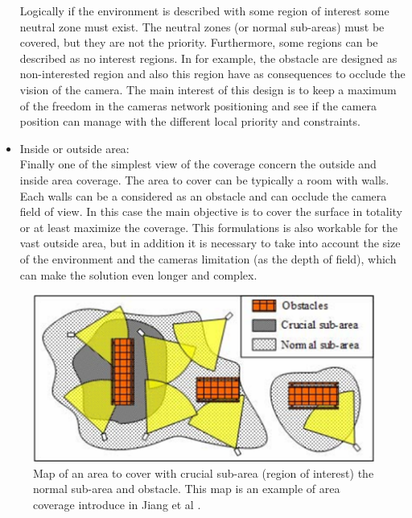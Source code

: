 \begin{itemize}
Logically if the environment is described with some region of interest some neutral zone must exist. The neutral zones (or normal sub-areas) must be covered, but they are not the priority. Furthermore, some regions can be described as no interest regions. In \cite{165*jiang2010,171*horster2006}  for example, the obstacle are designed as non-interested region and also this region have as consequences to occlude the vision of the camera. The main interest of this design is to keep a maximum of the freedom in the cameras network positioning and see if the camera position can manage with the different local priority and constraints.\\
\item Inside or outside area:\\ 
Finally one of the simplest view of the coverage concern the outside and inside area coverage. The area to cover can be typically a room with walls. Each walls can be a considered as an obstacle and can occlude the camera field of view. In this case the main objective is to cover the surface in totality or at least maximize the coverage. This formulations is also workable for the vast outside area, but in addition it is necessary to take into account the size of the environment and the cameras limitation (as the depth of field), which can make the solution even longer and complex.
   
\end{itemize}
  


\begin{figure}[t!]
\center
{}
   \includegraphics[width=\linewidth]{img/MapRoI165.png}
  \caption{ Map of an area to cover with crucial sub-area (region of interest) the normal sub-area  and obstacle. This map is an example of area coverage  introduce in  Jiang et al \cite{165*jiang2010}. }\label{fig:MapRoI165}
  \endminipage\hfill
\end{figure}

